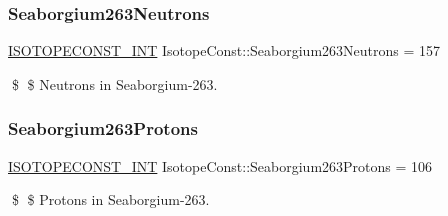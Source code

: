 \subsubsection{\texorpdfstring{Seaborgium263\+Neutrons}{Seaborgium263Neutrons}}
{\footnotesize\ttfamily \mbox{\hyperlink{group___isotope_const-_macros_ga5f18360b3e99483a35c32d789e62621c}{I\+S\+O\+T\+O\+P\+E\+C\+O\+N\+S\+T\+\_\+\+I\+NT}} Isotope\+Const\+::\+Seaborgium263\+Neutrons = 157}

\$ \$ Neutrons in Seaborgium-\/263. \mbox{\label{group___isotope_const-_seaborgium-_sg263_ga3a78f7d3e12f4e81a01e1999a0203486}} 
\subsubsection{\texorpdfstring{Seaborgium263\+Protons}{Seaborgium263Protons}}
{\footnotesize\ttfamily \mbox{\hyperlink{group___isotope_const-_macros_ga5f18360b3e99483a35c32d789e62621c}{I\+S\+O\+T\+O\+P\+E\+C\+O\+N\+S\+T\+\_\+\+I\+NT}} Isotope\+Const\+::\+Seaborgium263\+Protons = 106}

\$ \$ Protons in Seaborgium-\/263. 